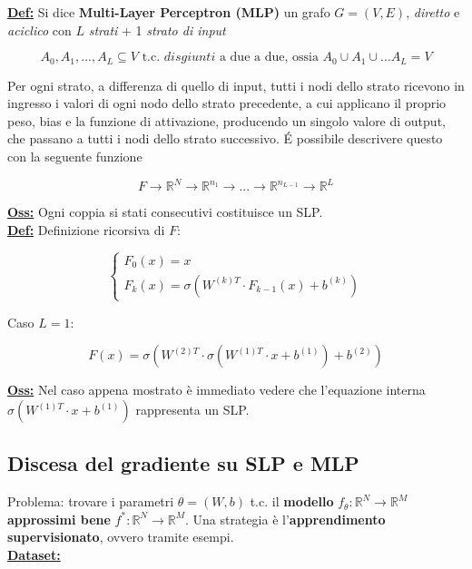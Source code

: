 \documentclass[a4paper,12pt]{article}
\newcommand{\definizione}{\noindent\textbf{\underline{Def:}} }
\newcommand{\osservazione}{\noindent\textbf{\underline{Oss:}} }
\begin{document}
	\definizione Si dice \textbf{Multi-Layer Perceptron (MLP)} un grafo $G = (V,E)$, \textit{diretto} e \textit{aciclico} con $L$ \textit{strati} + 1 \textit{strato di input}

	\[
	A_0, A_1, ..., A_L \subseteq V \text{ t.c. } \textit{disgiunti} \text{ a due a due, ossia } A_0 \cup A_1 \cup ... A_L = V
	\]

	Per ogni strato, a differenza di quello di input, tutti i nodi dello strato ricevono in ingresso i valori di ogni nodo dello strato precedente, a cui applicano il proprio peso, bias e la funzione di attivazione, producendo un singolo valore di output, che passano a tutti i nodi dello strato successivo. \'E possibile descrivere questo con la seguente funzione

	\[
	F \rightarrow \mathbb{R}^N \rightarrow \mathbb{R}^{n_1} \rightarrow ... \rightarrow \mathbb{R}^{n_{L - 1}} \rightarrow \mathbb{R}^L
	\]

	\osservazione Ogni coppia si stati consecutivi costituisce un SLP. \\

	\definizione Definizione ricorsiva di $F$:

	\[
	\begin{cases}
		F_0 (x) = x \\
		F_k (x) = \sigma ( W^{(k)T} \cdot F_{k -1}(x) + b^{(k)})
	\end{cases}
	\]

	Caso $L = 1$:

	\[
	F(x) = \sigma ( W^{(2) T} \cdot \sigma(W^{(1) T} \cdot x +b^{(1)} ) + b^{(2)} )
	\]

	\osservazione Nel caso appena mostrato è immediato vedere che l'equazione interna $ \sigma(W^{(1) T} \cdot x +b^{(1)}) $ rappresenta un SLP. \\

	\subsection{Discesa del gradiente su SLP e MLP}

	Problema: trovare i parametri $\theta = (W, b)$ t.c. il \textbf{modello} $ f_\theta : \mathbb{R}^N \rightarrow \mathbb{R}^M$ \textbf{ approssimi bene } $ f^* : \mathbb{R}^N \rightarrow \mathbb{R}^M$. Una strategia è l'\textbf{apprendimento supervisionato}, ovvero tramite esempi. \\

	\textbf{\underline{Dataset:}}\\
\end{document}
